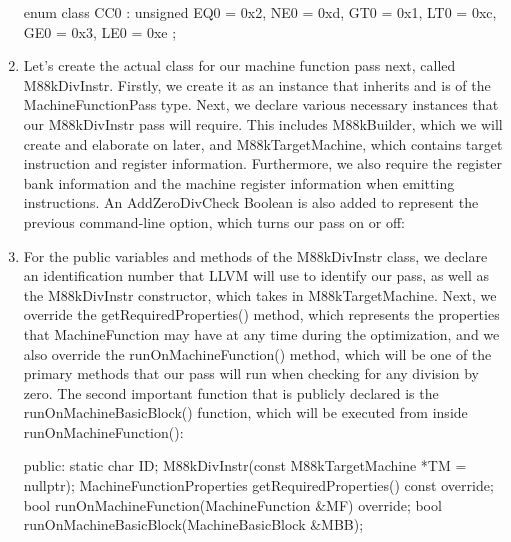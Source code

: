 \begin{enumerate}
\begin{cpp}
enum class CC0 : unsigned {
    EQ0 = 0x2,
    NE0 = 0xd,
    GT0 = 0x1,
    LT0 = 0xc,
    GE0 = 0x3,
    LE0 = 0xe
};
\end{cpp}

\item
Let’s create the actual class for our machine function pass next, called M88kDivInstr. Firstly, we create it as an instance that inherits and is of the MachineFunctionPass type. Next, we declare various necessary instances that our M88kDivInstr pass will require. This includes M88kBuilder, which we will create and elaborate on later, and M88kTargetMachine, which contains target instruction and register information. Furthermore, we also require the register bank information and the machine register information when emitting instructions. An AddZeroDivCheck Boolean is also added to represent the previous command-line option, which turns our pass on or off:

\begin{cpp}
class M88kDivInstr : public MachineFunctionPass {
    friend class M88kBuilder;
    const M88kTargetMachine *TM;
    const TargetInstrInfo *TII;
    const TargetRegisterInfo *TRI;
    const RegisterBankInfo *RBI;
    MachineRegisterInfo *MRI;
    bool AddZeroDivCheck;
\end{cpp}

\item
For the public variables and methods of the M88kDivInstr class, we declare an identification number that LLVM will use to identify our pass, as well as the M88kDivInstr constructor, which takes in M88kTargetMachine. Next, we override the getRequiredProperties() method, which represents the properties that MachineFunction may have at any time during the optimization, and we also override the runOnMachineFunction() method, which will be one of the primary methods that our pass will run when checking for any division by zero. The second important function that is publicly declared is the runOnMachineBasicBlock() function, which will be executed from inside runOnMachineFunction():

\begin{cpp}
public:
    static char ID;
    M88kDivInstr(const M88kTargetMachine *TM = nullptr);
    MachineFunctionProperties getRequiredProperties() const override;
    bool runOnMachineFunction(MachineFunction &MF) override;
    bool runOnMachineBasicBlock(MachineBasicBlock &MBB);
\end{cpp}


\end{enumerate}
